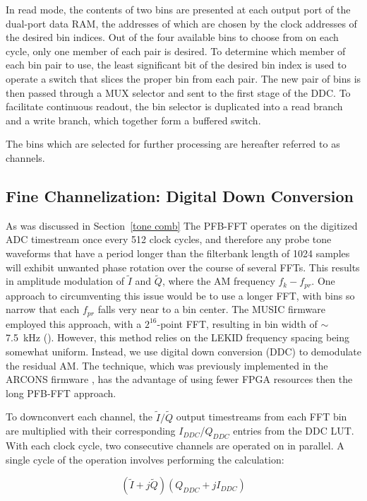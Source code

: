 In read mode, the contents of two bins are presented at each output port of the dual-port data RAM, the addresses of which are chosen by the clock addresses of the desired bin indices. Out of the four available bins to choose from on each cycle, only one member of each pair is desired. To determine which member of each bin pair to use, the least significant bit of the desired bin index is used to operate a switch that slices the proper bin from each pair. The new pair of bins is then passed through a MUX selector and sent to the first stage of the DDC. To facilitate continuous readout, the bin selector is duplicated into a read branch and a write branch, which together form a buffered switch.

The bins which are selected for further processing are hereafter referred to as channels.

\subsection{Fine Channelization: Digital Down Conversion}\label{ddc}

As was discussed in Section~\ref{tone comb} The PFB-FFT operates on the digitized ADC timestream once every 512 clock cycles, and therefore any probe tone waveforms that have a period longer than the filterbank length of 1024 samples will exhibit unwanted phase rotation over the course of several FFTs. This results in amplitude modulation of $\widetilde{I}$ and $\widetilde{Q}$, where the AM frequency $f_{k} - f_{pr}$. One approach to circumventing this issue would be to use a longer FFT, with bins so narrow that each $f_{pr}$ falls very near to a bin center. The MUSIC firmware employed this approach, with a $2^{16}$-point FFT, resulting in bin width of $\sim${7.5}~kHz (\citet{duan2010open}). However, this method relies on the LEKID frequency spacing being somewhat uniform. Instead, we use digital down conversion (DDC) to demodulate the residual AM. The technique, which was previously implemented in the ARCONS firmware \citep{mchugh2012readout}, has the advantage of using fewer FPGA resources then the long PFB-FFT approach.

To downconvert each channel, the $\widetilde{I}/\widetilde{Q}$ output timestreams from each FFT bin are multiplied with their corresponding $I_{DDC}$/$Q_{DDC}$ entries from the DDC LUT. With each clock cycle, two consecutive channels are operated on in parallel. A single cycle of the operation involves performing the calculation:

\begin{equation}
  (\widetilde{I} + j\widetilde{Q})(Q_{DDC} + jI_{DDC})
\end{equation}

